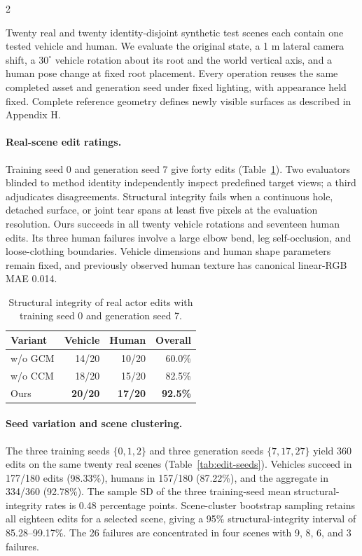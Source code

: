 \begin{multicols}{2}

Twenty real and twenty identity-disjoint synthetic test scenes each contain one tested vehicle and human. We evaluate the original state, a 1 m lateral camera shift, a $30^\circ$ vehicle rotation about its root and the world vertical axis, and a human pose change at fixed root placement. Every operation reuses the same completed asset and generation seed under fixed lighting, with appearance held fixed. Complete reference geometry defines newly visible surfaces as described in Appendix H.

\paragraph{Real-scene edit ratings.}
Training seed 0 and generation seed 7 give forty edits (Table~\ref{tab:edit-failures}). Two evaluators blinded to method identity independently inspect predefined target views; a third adjudicates disagreements. Structural integrity fails when a continuous hole, detached surface, or joint tear spans at least five pixels at the evaluation resolution. Ours succeeds in all twenty vehicle rotations and seventeen human edits. Its three human failures involve a large elbow bend, leg self-occlusion, and loose-clothing boundaries. Vehicle dimensions and human shape parameters remain fixed, and previously observed human texture has canonical linear-RGB MAE 0.014.

\begin{table}[H]
\centering\small
\caption{Structural integrity of real actor edits with training seed 0 and generation seed 7.}
\label{tab:edit-failures}
\begin{tabular}{@{}lrrr@{}}
\toprule
Variant & Vehicle & Human & Overall \\
\midrule
w/o GCM & 14/20 & 10/20 & 60.0\% \\
w/o CCM & 18/20 & 15/20 & 82.5\% \\
Ours & \textbf{20/20} & \textbf{17/20} & \textbf{92.5\%} \\
\bottomrule
\end{tabular}
\end{table}

\paragraph{Seed variation and scene clustering.}
The three training seeds $\{0,1,2\}$ and three generation seeds $\{7,17,27\}$ yield 360 edits on the same twenty real scenes (Table~\ref{tab:edit-seeds}). Vehicles succeed in 177/180 edits (98.33\%), humans in 157/180 (87.22\%), and the aggregate in 334/360 (92.78\%). The sample SD of the three training-seed mean structural-integrity rates is 0.48 percentage points. Scene-cluster bootstrap sampling retains all eighteen edits for a selected scene, giving a 95\% structural-integrity interval of 85.28--99.17\%. The 26 failures are concentrated in four scenes with 9, 8, 6, and 3 failures.


\end{multicols}
